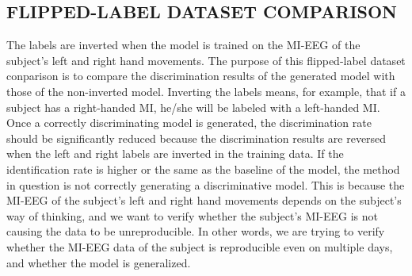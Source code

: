     \subsection{FLIPPED-LABEL DATASET COMPARISON}
    The labels are inverted when the model is trained on the MI-EEG of the
    subject's left and right hand movements. The purpose of this flipped-label dataset conparison is to
    compare the discrimination results of the generated model with those of the non-inverted
    model. Inverting the labels means, for example, that if a subject has a
    right-handed MI, he/she will be labeled with a left-handed MI. Once a
    correctly discriminating model is generated, the discrimination rate should be
    significantly reduced because the discrimination results are reversed when the
    left and right labels are inverted in the training data. If the
    identification rate is higher or the same as the baseline of the model, the method
    in question is not correctly generating a discriminative model. This is
    because the MI-EEG of the subject's left and right hand movements depends on
    the subject's way of thinking, and we want to verify whether the subject's MI-EEG
    is not causing the data to be unreproducible. In other words, we are trying to
    verify whether the MI-EEG data of the subject is reproducible even on multiple
    days, and whether the model is generalized.